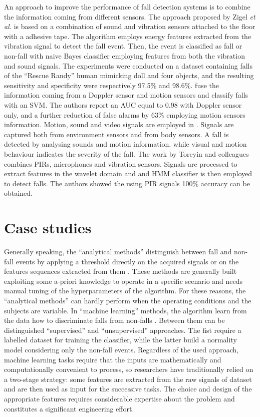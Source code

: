 An approach to improve the performance of fall detection systems is to combine the information coming from different sensors. The approach proposed by Zigel \textit{et al.} \cite{zigel2009method} is based on a combination of sound and vibration sensors attached to the floor with a adhesive tape. The algorithm employs energy features extracted from the vibration signal to detect the fall event. Then, the event is classified as fall or non-fall with naive Bayes classifier employing features from both the vibration and sound signals. The experiments were conducted on a dataset containing falls of the ``Rescue Randy'' human mimicking doll and four objects, and the resulting sensitivity and specificity were respectively 97.5\% and 98.6\%. \cite{Liu2014} fuse the information coming from a Doppler sensor and motion sensors and classify falls with an SVM. The authors report an AUC equal to 0.98 with Doppler sensor only, and a further reduction of false alarms by 63\% employing motion sensors information. Motion, sound and video signals are employed in \cite{Doukas2011}. Signals are captured both from environment sensors and from body sensors. A fall is detected by analysing sounds and motion information, while visual and motion behaviour indicates the severity of the fall. The work by Toreyin and colleagues \cite{Toreyin2008} combines PIRs, microphones and vibration sensors. Signals are processed to extract features in the wavelet domain and and HMM classifier is then employed to detect falls. The authors showed the using PIR signals 100\% accuracy can be obtained.

\section{Case studies}
Generally speaking, the ``analytical methods'' distinguish between fall and non-fall events by applying a threshold directly on the acquired signals or on the features sequences extracted from them \cite{noury2007fall}.
These methods are generally built exploiting some a-priori knowledge to operate in a specific scenario and needs manual tuning of the hyperparameters of the algorithm. For these reasons, the ``analytical methods'' can hardly perform when the operating conditions and the subjects are variable. In ``machine learning'' methods, the algorithm learn from the data how to discriminate falls from non-falls \cite{noury2007fall}. Between them can be distinguished ``supervised'' and  ``unsupervised'' approaches. The fist  require a labelled dataset for training the classifier, while the latter build a normality model considering only the non-fall events. Regardless of the used approach, machine learning tasks require that the inputs are mathematically and computationally convenient to process, so researchers have traditionally relied on a two-stage strategy: some features are extracted from the raw signals of dataset and are then used as input for the successive tasks. The choice and design of the appropriate features requires considerable expertise about the problem and constitutes a significant engineering effort.

